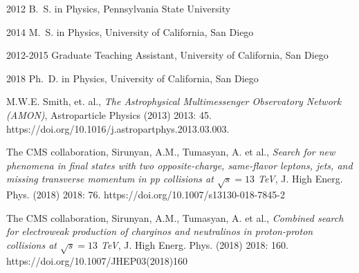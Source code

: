 \begin{frontmatter}
%
\tableofcontents
\listoffigures  %
\listoftables   %



%
%
\begin{acknowledgements}
 
\end{acknowledgements}


%
%
\begin{vitapage}
\begin{vita}
  \item[2012] B.~S. in Physics, Pennsylvania State University
  \item[2014] M.~S. in Physics, University of California, San Diego
  \item[2012-2015] Graduate Teaching Assistant, University of California, San Diego
  \item[2018] Ph.~D. in Physics, University of California, San Diego
\end{vita}
\begin{publications}
  \item M.W.E. Smith, et. al., \emph{The Astrophysical Multimessenger Observatory Network (AMON)}, Astroparticle Physics (2013) 2013: 45. https://doi.org/10.1016/j.astropartphys.2013.03.003.
  \item The CMS collaboration, Sirunyan, A.M., Tumasyan, A. et al., \emph{Search for new phenomena in final states with two opposite-charge, same-flavor leptons, jets, and missing transverse momentum in pp collisions at $\sqrt{s}=13$ TeV},  J. High Energ. Phys. (2018) 2018: 76. https://doi.org/10.1007/s13130-018-7845-2
  \item The CMS collaboration, Sirunyan, A.M., Tumasyan, A. et al., \emph{Combined search for electroweak production of charginos and neutralinos in proton-proton collisions at  $\sqrt{s}=13$ TeV}, J. High Energ. Phys. (2018) 2018: 160. https://doi.org/10.1007/JHEP03(2018)160
\end{publications}
\end{vitapage}



\end{frontmatter}
